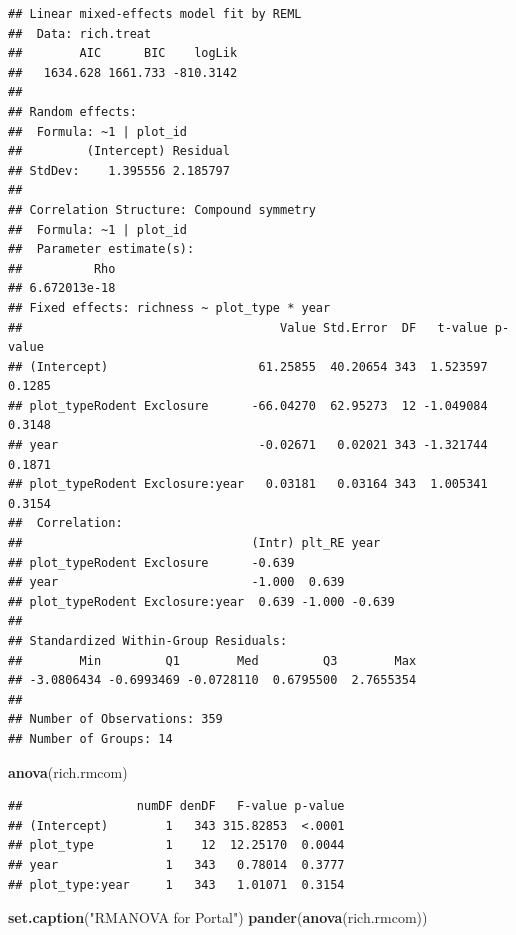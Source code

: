 \documentclass[]{article}
\newenvironment{Shaded}{\begin{snugshade}}{\end{snugshade}}
\newcommand{\KeywordTok}[1]{\textcolor[rgb]{0.13,0.29,0.53}{\textbf{{#1}}}}
\newcommand{\StringTok}[1]{\textcolor[rgb]{0.31,0.60,0.02}{{#1}}}
\newcommand{\NormalTok}[1]{{#1}}
\begin{document}
\begin{verbatim}
## Linear mixed-effects model fit by REML
##  Data: rich.treat 
##        AIC      BIC    logLik
##   1634.628 1661.733 -810.3142
## 
## Random effects:
##  Formula: ~1 | plot_id
##         (Intercept) Residual
## StdDev:    1.395556 2.185797
## 
## Correlation Structure: Compound symmetry
##  Formula: ~1 | plot_id 
##  Parameter estimate(s):
##          Rho 
## 6.672013e-18 
## Fixed effects: richness ~ plot_type * year 
##                                    Value Std.Error  DF   t-value p-value
## (Intercept)                     61.25855  40.20654 343  1.523597  0.1285
## plot_typeRodent Exclosure      -66.04270  62.95273  12 -1.049084  0.3148
## year                            -0.02671   0.02021 343 -1.321744  0.1871
## plot_typeRodent Exclosure:year   0.03181   0.03164 343  1.005341  0.3154
##  Correlation: 
##                                (Intr) plt_RE year  
## plot_typeRodent Exclosure      -0.639              
## year                           -1.000  0.639       
## plot_typeRodent Exclosure:year  0.639 -1.000 -0.639
## 
## Standardized Within-Group Residuals:
##        Min         Q1        Med         Q3        Max 
## -3.0806434 -0.6993469 -0.0728110  0.6795500  2.7655354 
## 
## Number of Observations: 359
## Number of Groups: 14
\end{verbatim}

\begin{Shaded}
\begin{Highlighting}[]
\KeywordTok{anova}\NormalTok{(rich.rmcom)}
\end{Highlighting}
\end{Shaded}

\begin{verbatim}
##                numDF denDF   F-value p-value
## (Intercept)        1   343 315.82853  <.0001
## plot_type          1    12  12.25170  0.0044
## year               1   343   0.78014  0.3777
## plot_type:year     1   343   1.01071  0.3154
\end{verbatim}

\begin{Shaded}
\begin{Highlighting}[]
\KeywordTok{set.caption}\NormalTok{(}\StringTok{"RMANOVA for Portal"}\NormalTok{)}
\KeywordTok{pander}\NormalTok{(}\KeywordTok{anova}\NormalTok{(rich.rmcom))}
\end{Highlighting}
\end{Shaded}
\end{document}
